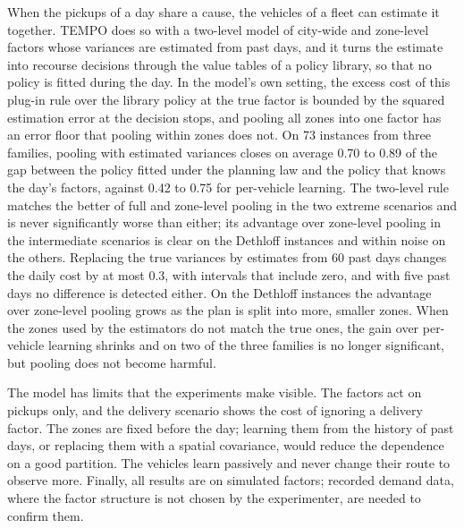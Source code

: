 \documentclass[preprint,authoryear,12pt]{elsarticle}
\begin{document}
When the pickups of a day share a cause, the vehicles of a fleet can
estimate it together. TEMPO does so with a two-level model of city-wide
and zone-level factors whose variances are estimated from past days, and
it turns the estimate into recourse decisions through the value tables
of a policy library, so that no policy is fitted during the day. In the
model's own setting, the excess cost of this plug-in rule over the
library policy at the true factor is bounded by the squared estimation
error at the decision stops, and pooling all zones into one factor has
an error floor that pooling within zones does not. On 73 instances from
three families, pooling with estimated variances closes on average 0.70
to 0.89 of the gap between the policy fitted under the planning law and
the policy that knows the day's factors, against 0.42 to 0.75 for
per-vehicle learning. The two-level rule matches the better of full and
zone-level pooling in the two extreme scenarios and is never
significantly worse than either; its advantage over zone-level pooling
in the intermediate scenarios is clear on the Dethloff instances and
within noise on the others. Replacing the true variances by estimates
from 60 past days changes the daily cost by at most 0.3, with intervals
that include zero, and with five past days no difference is detected either.
On the Dethloff instances the advantage over zone-level pooling grows
as the plan is split into more, smaller zones. When the zones used by the estimators do
not match the true ones, the gain over per-vehicle learning shrinks and
on two of the three families is no longer significant, but pooling
does not become harmful.

The model has limits that the experiments make visible. The factors act
on pickups only, and the delivery scenario shows the cost of ignoring a
delivery factor. The zones are fixed before the day; learning them from
the history of past days, or replacing them with a spatial covariance,
would reduce the dependence on a good partition. The vehicles learn
passively and never change their route to observe more. Finally, all
results are on simulated factors; recorded demand data, where the
factor structure is not chosen by the experimenter, are needed to
confirm them.



\end{document}
